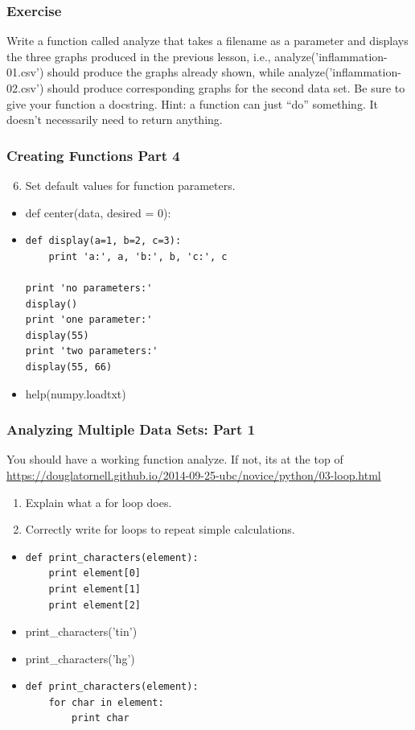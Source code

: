 \documentclass[xcolor=dvipsnames]{beamer}
\begin{document}
\begin{frame}
\frametitle{Exercise}
Write a function called analyze that takes a filename as a parameter and displays the three graphs produced in the previous lesson, i.e., analyze('inflammation-01.csv') should produce the graphs already shown, while analyze('inflammation-02.csv') should produce corresponding graphs for the second data set. Be sure to give your function a docstring. Hint: a function can just ``do'' something.  It doesn't necessarily need to return anything.
\end{frame}



\begin{frame}[fragile]
\frametitle{Creating Functions Part 4}
\begin{enumerate}
\setcounter{enumi}{5}
\item    Set default values for function parameters.
\end{enumerate}
\begin{itemize}
\item def center(data, desired = 0):
\item
\begin{verbatim}
def display(a=1, b=2, c=3):
    print 'a:', a, 'b:', b, 'c:', c

print 'no parameters:'
display()
print 'one parameter:'
display(55)
print 'two parameters:'
display(55, 66)
\end{verbatim}
\item help(numpy.loadtxt)
\end{itemize}
\end{frame}

\begin{frame}[fragile]
\frametitle{Analyzing Multiple Data Sets: Part 1}
You should have a working function analyze.  If not, its at the top of
\url{https://douglatornell.github.io/2014-09-25-ubc/novice/python/03-loop.html}
\begin{enumerate}
\item    Explain what a for loop does.
\item    Correctly write for loops to repeat simple calculations.
\end{enumerate}
\begin{itemize}
\item
\begin{verbatim}
def print_characters(element):
    print element[0]
    print element[1]
    print element[2]
\end{verbatim}
\item print\_characters('tin')
\item print\_characters('hg')
\item
\begin{verbatim}
def print_characters(element):
    for char in element:
        print char
\end{verbatim}
\end{itemize}
\end{frame}
\end{document}
